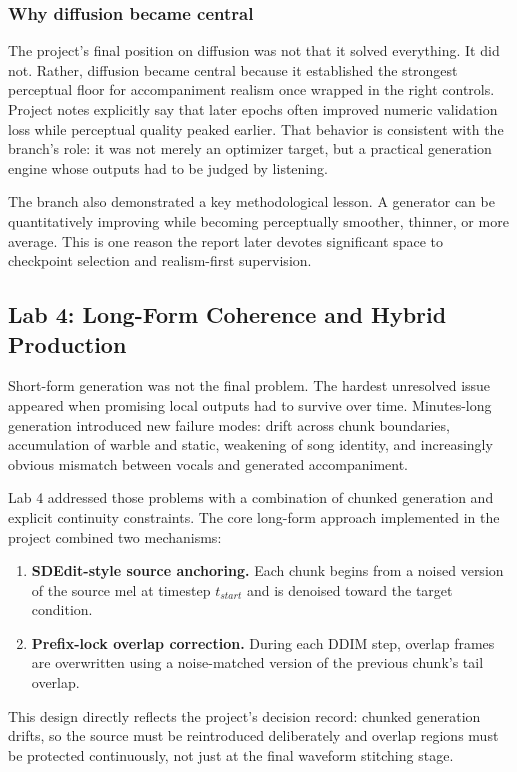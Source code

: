 \documentclass[conference]{IEEEtran}
\begin{document}
\subsubsection{Why diffusion became central}
The project's final position on diffusion was not that it solved everything. It did not. Rather, diffusion became central because it established the strongest perceptual floor for accompaniment realism once wrapped in the right controls. Project notes explicitly say that later epochs often improved numeric validation loss while perceptual quality peaked earlier. That behavior is consistent with the branch's role: it was not merely an optimizer target, but a practical generation engine whose outputs had to be judged by listening.

The branch also demonstrated a key methodological lesson. A generator can be quantitatively improving while becoming perceptually smoother, thinner, or more average. This is one reason the report later devotes significant space to checkpoint selection and realism-first supervision.

\subsection{Lab 4: Long-Form Coherence and Hybrid Production}
Short-form generation was not the final problem. The hardest unresolved issue appeared when promising local outputs had to survive over time. Minutes-long generation introduced new failure modes: drift across chunk boundaries, accumulation of warble and static, weakening of song identity, and increasingly obvious mismatch between vocals and generated accompaniment.

Lab 4 addressed those problems with a combination of chunked generation and explicit continuity constraints. The core long-form approach implemented in the project combined two mechanisms:
\begin{enumerate}[leftmargin=1.5em]
    \item \textbf{SDEdit-style source anchoring.} Each chunk begins from a noised version of the source mel at timestep $t_{start}$ and is denoised toward the target condition.
    \item \textbf{Prefix-lock overlap correction.} During each DDIM step, overlap frames are overwritten using a noise-matched version of the previous chunk's tail overlap.
\end{enumerate}

This design directly reflects the project's decision record: chunked generation drifts, so the source must be reintroduced deliberately and overlap regions must be protected continuously, not just at the final waveform stitching stage.
\end{document}
